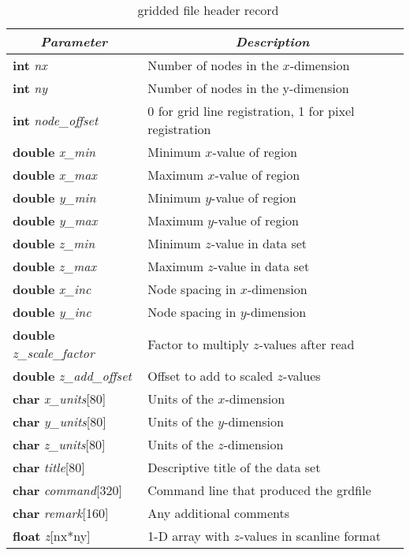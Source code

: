 \begin{table}
\centering
\begin{tabular}{|l|l|} \hline
\multicolumn{1}{|c}{\emph{Parameter}}	&	\multicolumn{1}{|c|}{\emph{Description}}	\\ \hline
{\bf int} {\it nx}			&	Number of nodes in the $x$-dimension	\\ \hline
{\bf int} {\it ny}			&	Number of nodes in the y-dimension	\\ \hline
{\bf int} {\it node\_offset}	&	0 for grid line registration, 1 for pixel registration  \\ \hline
{\bf double} {\it x\_min}		&	Minimum $x$-value of region	\\ \hline
{\bf double} {\it x\_max}		&	Maximum $x$-value of region  \\ \hline
{\bf double} {\it y\_min}		&	Minimum $y$-value of region  \\ \hline
{\bf double} {\it y\_max}		&	Maximum $y$-value of region  \\ \hline
{\bf double} {\it z\_min}		&	Minimum $z$-value in data set  \\ \hline
{\bf double} {\it z\_max}		&	Maximum $z$-value in data set  \\ \hline
{\bf double} {\it x\_inc}		&	Node spacing in $x$-dimension  \\ \hline
{\bf double} {\it y\_inc}		&	Node spacing in $y$-dimension  \\ \hline
{\bf double} {\it z\_scale\_factor}	&	Factor to multiply $z$-values after read  \\ \hline
{\bf double} {\it z\_add\_offset}	&	Offset to add to scaled $z$-values  \\ \hline
{\bf char} {\it x\_units}[80]	&	Units of the $x$-dimension	\\ \hline
{\bf char} {\it y\_units}[80]	&	Units of the $y$-dimension	\\ \hline
{\bf char} {\it z\_units}[80]	&	Units of the $z$-dimension	\\ \hline 
{\bf char} {\it title}[80]	&	Descriptive title of the data set	\\ \hline
{\bf char} {\it command}[320]	&	Command line that produced the grdfile	\\ \hline
{\bf char} {\it remark}[160]	&	Any additional comments	\\ \hline \hline
{\bf float} {\it z}[nx*ny]	&	1-D array with $z$-values in scanline format \\ \hline

\end{tabular} 

\caption{\gmt\ gridded file header record}
\label{tbl:grdheader}
\end{table}

